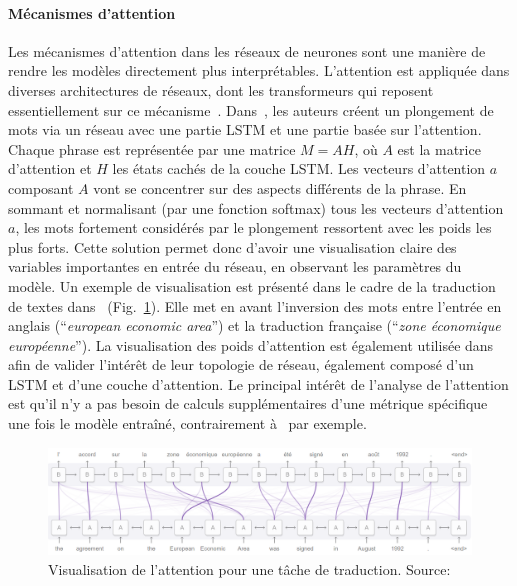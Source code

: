 \paragraph{Mécanismes d'attention}\label{paragraph:attention}
Les mécanismes d'attention dans les réseaux de neurones sont une manière de rendre les modèles directement plus interprétables\cite{Bahdanau2015}. L'attention est appliquée dans diverses architectures de réseaux, dont les transformeurs qui reposent essentiellement sur ce mécanisme~\cite{Vaswani2017, Abnar2020}. Dans~\cite{Lin2017}, les auteurs créent un plongement de mots via un réseau avec une partie LSTM et une partie basée sur l'attention. Chaque phrase est représentée par une matrice $M = AH$, où $A$ est la matrice d'attention et $H$ les états cachés de la couche LSTM. Les vecteurs d'attention $a$ composant $A$ vont se concentrer sur des aspects différents de la phrase. En sommant et normalisant (par une fonction softmax) tous les vecteurs d'attention $a$, les mots fortement considérés par le plongement ressortent avec les poids les plus forts.
Cette solution permet donc d'avoir une visualisation claire des variables importantes en entrée du réseau, en observant les paramètres du modèle. Un exemple de visualisation est présenté dans le cadre de la traduction de textes dans~\cite{Olah2016} (Fig.~\ref{fig:lstm_attention}). Elle met en avant l'inversion des mots entre l'entrée en anglais (``\textit{european economic area}'') et la traduction française (``\textit{zone économique européenne}''). La visualisation des poids d'attention est également utilisée dans~\cite{Wang2016} afin de valider l'intérêt de leur topologie de réseau, également composé d'un LSTM et d'une couche d'attention. Le principal intérêt de l'analyse de l'attention est qu'il n'y a pas besoin de calculs supplémentaires d'une métrique spécifique une fois le modèle entraîné, contrairement à~\cite{Bach2015} par exemple.

\begin{figure}[htpb!]
\centering
\includegraphics[width=\textwidth]{S1-Comment_evaluer_une_explication/figures/lstm_attention.png}
\caption{Visualisation de l'attention pour une tâche de traduction. Source:~\cite{Olah2016}}
\label{fig:lstm_attention}
\end{figure}

